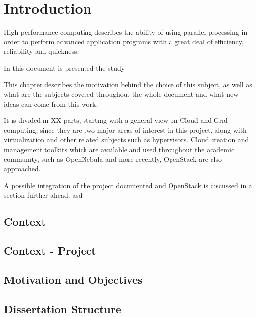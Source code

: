 \chapter{Introduction} \label{chap:intro}


High performance computing describes the ability of using parallel processing in order to perform advanced application programs with a great deal of efficiency, reliability and quickness. \cite{http://searchenterpriselinux.techtarget.com/definition/high-performance-computing}

In this document is presented the study 

This chapter describes the motivation behind the choice of this subject, as well as what are the subjects covered throughout the whole document and what new ideas can come from this work.

It is divided in XX parts, starting with a general view on Cloud and Grid computing, since they are two major areas of interest in this project, along with virtualization and other related subjects such as hypervisors. Cloud creation and management toolkits which are available and used throughout the academic community, such as OpenNebula and more recently, OpenStack are also approached.

A possible integration of the project documented and OpenStack is discussed in a section further ahead. asd
\section{Context} \label{sec:context}

\section{Context - Project} \label{sec:context_project}

\section{Motivation and Objectives} \label{sec:motivation}

\section{Dissertation Structure} \label{sec:structure}

